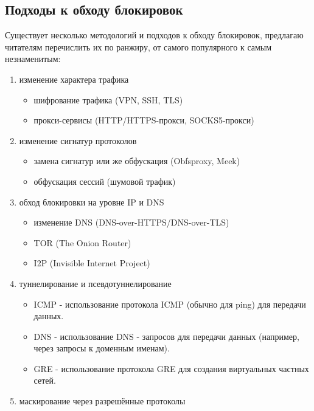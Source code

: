 \documentclass[utf8,14pt,a4paper,oneside,russian]{book}
\begin{document}
\subsection{Подходы к обходу блокировок}

Существует несколько методологий и подходов к обходу блокировок, предлагаю читателям перечислить их по ранжиру, от самого популярного к самым
незнаменитым:

\begin{enumerate}
    \item изменение характера трафика
          \begin{itemize}
              \item шифрование трафика (VPN, SSH, TLS)
              \item прокси-сервисы (HTTP/HTTPS-прокси, SOCKS5-прокси)
          \end{itemize}
    \item изменение сигнатур протоколов
          \begin{itemize}
              \item замена сигнатур или же обфускация (Obfsproxy, Meek)
              \item обфускация сессий (шумовой трафик)
          \end{itemize}
    \item обход блокировки на уровне IP и DNS
          \begin{itemize}
              \item изменение DNS (DNS-over-HTTPS/DNS-over-TLS)
              \item TOR (The Onion Router)
              \item I2P (Invisible Internet Project)
          \end{itemize}
    \item туннелирование и псевдотуннелирование
          \begin{itemize}
              \item ICMP - использование протокола ICMP (обычно для ping) для передачи данных.
              \item DNS - использование DNS - запросов для передачи данных (например, через запросы к доменным именам).
              \item GRE - использование протокола GRE для создания виртуальных частных сетей.
          \end{itemize}
    \item маскирование через разрешённые протоколы
          \begin{itemize}

\end{itemize}
\end{enumerate}
\end{document}
